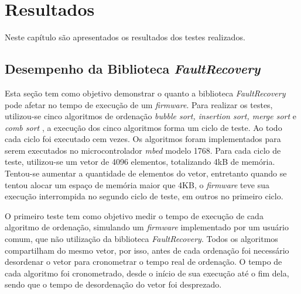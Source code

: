 
\chapter{Resultados} \label{cap:Resultados}

Neste capítulo são apresentados os resultados dos testes realizados. 

\section{Desempenho da Biblioteca \textit{FaultRecovery}} \label{Sec:tempoRecovery}

Esta seção tem como objetivo demonstrar o quanto a biblioteca \textit{FaultRecovery} pode afetar no tempo de execução de um \textit{firmware}. Para realizar os testes, utilizou-se cinco algoritmos de ordenação \textit{bubble sort, insertion sort, merge sort} e \textit{comb sort} \cite{orderUnicamp, vivaLinux}, a execução dos cinco algoritmos forma um ciclo de teste. Ao todo cada ciclo foi executado cem vezes. Os algoritmos foram implementados para serem executados no microcontrolador \textit{mbed} modelo 1768. Para cada ciclo de teste, utilizou-se um vetor de 4096 elementos, totalizando 4kB de memória. Tentou-se aumentar a quantidade de elementos do vetor, entretanto quando se tentou alocar um espaço de memória maior que 4KB, o \textit{firmware} teve sua execução interrompida no segundo ciclo de teste, em outros no primeiro ciclo.

O primeiro teste tem como objetivo medir o tempo de execução de cada algoritmo de ordenação, simulando um \textit{firmware} implementado por um usuário comum, que não utilização da biblioteca \textit{FaultRecovery}. Todos os algoritmos compartilham do mesmo vetor, por isso, antes de cada ordenação foi necessário desordenar o vetor para cronometrar o tempo real de ordenação. O tempo de cada algoritmo foi cronometrado, desde o início de sua execução até o fim dela, sendo que o tempo de desordenação do vetor foi desprezado.

